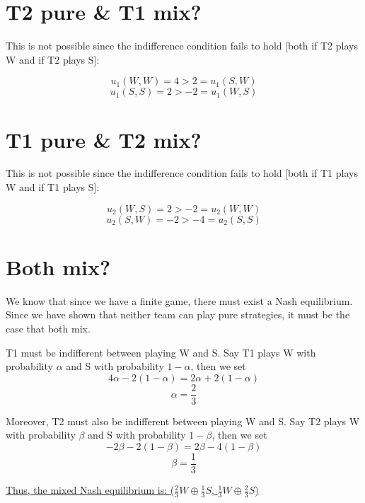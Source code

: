 \documentclass{article}
\begin{document}
\section{T2 pure \& T1 mix?}
This is not possible since the indifference condition fails to hold [both if T2 plays W and if T2 plays S]:

$$u_1(W,W)=4>2=u_1(S,W)$$ $$u_1(S,S)=2>-2=u_1(W,S)$$

\section{T1 pure \& T2 mix?}
This is not possible since the indifference condition fails to hold [both if T1 plays W and if T1 plays S]:

$$u_2(W,S)=2>-2=u_2(W,W)$$ $$u_2(S,W)=-2>-4=u_2(S,S)$$

\section{Both mix?}
We know that since we have a finite game, there must exist a Nash equilibrium. Since we have shown that neither team can play pure strategies, it must be the case that both mix. 

T1 must be indifferent between playing W and S. Say T1 plays W with probability $\alpha$ and S with probability $1-\alpha$, then we set
$$4\alpha - 2 (1-\alpha)=2\alpha + 2(1-\alpha)$$
$$\alpha=\frac{2}{3}$$

Moreover, T2 must also be indifferent between playing W and S. Say T2 plays W with probability $\beta$ and S with probability $1-\beta$, then we set
$$-2\beta - 2 (1-\beta)=2\beta - 4(1-\beta)$$
$$\beta=\frac{1}{3}$$

\underline{Thus, the mixed Nash equilibrium is: ($\frac{2}{3}W \oplus \frac{1}{3}S$, $\frac{1}{3}W \oplus \frac{2}{3}S$)}
\end{document}
